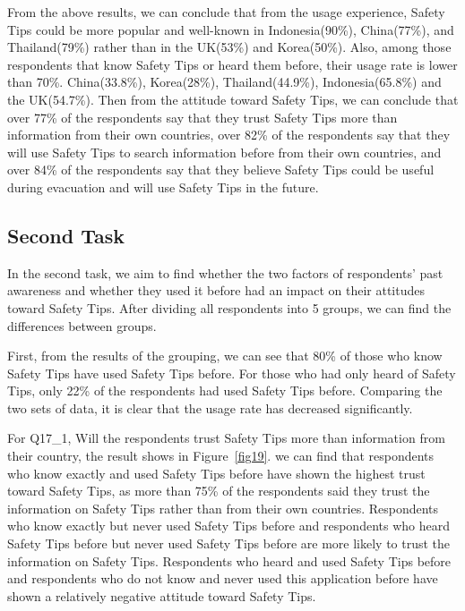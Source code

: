 From the above results, we can conclude that from the usage experience, Safety Tips could be more popular and well-known in Indonesia(90\%), China(77\%), and Thailand(79\%) rather than in the UK(53\%) and Korea(50\%). Also, among those respondents that know Safety Tips or heard them before, their usage rate is lower than 70\%. China(33.8\%), Korea(28\%), Thailand(44.9\%), Indonesia(65.8\%) and the UK(54.7\%). Then from the attitude toward Safety Tips, we can conclude that over 77\% of the respondents say that they trust Safety Tips more than information from their own countries, over 82\% of the respondents say that they will use Safety Tips to search information before from their own countries, and over 84\% of the respondents say that they believe Safety Tips could be useful during evacuation and will use Safety Tips in the future.

\subsection{Second Task}
In the second task, we aim to find whether the two factors of respondents' past awareness and whether they used it before had an impact on their attitudes toward Safety Tips. After dividing all respondents into 5 groups, we can find the differences between groups. 

First, from the results of the grouping, we can see that 80\% of those who know Safety Tips have used Safety Tips before. For those who had only heard of Safety Tips, only 22\% of the respondents had used Safety Tips before. Comparing the two sets of data, it is clear that the usage rate has decreased significantly.

For Q17\_1, Will the respondents trust Safety Tips more than information from their country, the result shows in Figure~\ref{fig19}. we can find that respondents who know exactly and used Safety Tips before have shown the highest trust toward Safety Tips, as more than 75\% of the respondents said they trust the information on Safety Tips rather than from their own countries. Respondents who know exactly but never used Safety Tips before and respondents who heard Safety Tips before but never used Safety Tips before are more likely to trust the information on Safety Tips. Respondents who heard and used Safety Tips before and respondents who do not know and never used this application before have shown a relatively negative attitude toward Safety Tips. 

